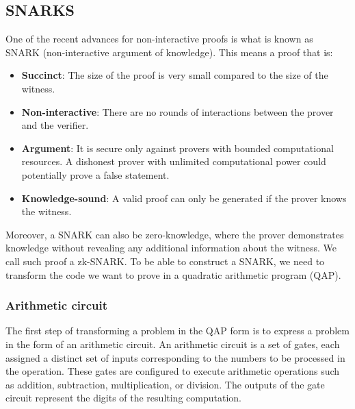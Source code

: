 \subsection{SNARKS}
One of the recent advances for non-interactive proofs is what is known as SNARK (non-interactive argument of knowledge).
This means a proof that is:
\begin{itemize}
\item \textbf{Succinct}: The size of the proof is very small compared to the size of the witness.
\item \textbf{Non-interactive}: There are no rounds of interactions between the prover and the verifier.
\item \textbf{Argument}: It is secure only against provers with bounded computational resources. A dishonest prover with unlimited computational power could potentially prove a false statement.
\item \textbf{Knowledge-sound}: A valid proof can only be generated if the prover knows the witness. \cite{NZ20}
\end{itemize}

Moreover, a SNARK can also be zero-knowledge, where the prover demonstrates knowledge without revealing any additional information about the witness. We call such proof a zk-SNARK.
To be able to construct a SNARK, we need to transform the code we want to prove in a quadratic arithmetic program (QAP).


\subsubsection{Arithmetic circuit}
\label{subsec:ac}
The first step of transforming a problem in the QAP form is to express a problem in the form of an arithmetic circuit.
An arithmetic circuit is a set of gates, each assigned a distinct set of inputs corresponding to the numbers to be processed in the operation.
These gates are configured to execute arithmetic operations such as addition, subtraction, multiplication, or division. The outputs of the gate circuit represent the digits of the resulting computation.

